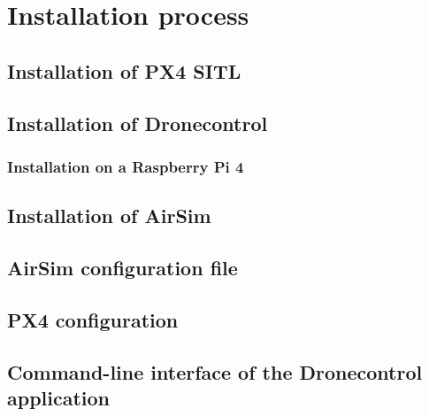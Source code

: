 \chapter{Installation process}

\section{Installation of PX4 SITL}
\label{app:install-px4}

\section{Installation of Dronecontrol}
\label{app:install-dronecontrol}

\subsection{Installation on a Raspberry Pi 4}
\label{app:install-dronecontrol-rpi}

\section{Installation of AirSim}
\label{app:install-airsim}

\section{AirSim configuration file}
\label{app:airsim-config}

\section{PX4 configuration}

\section{Command-line interface of the Dronecontrol application}
\label{app:cli}